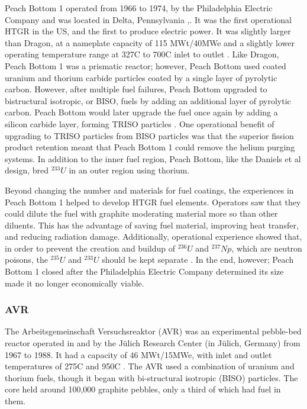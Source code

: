 Peach Bottom 1 operated from 1966 to 1974, by the Philadelphia Electric Company and was located in Delta, Pennsylvania \cite{beck_high_nodate},\cite{noauthor_peach_nodate}.  It was the first operational HTGR in the US, and the first to produce electric power.  It was slightly larger than Dragon, at a nameplate capacity of 115 MWt/40MWe and a slightly lower operating temperature range at 327\textdegree  C to 700\textdegree  C inlet to outlet \cite{beck_high_nodate}.  Like Dragon, Peach Bottom 1 was a prismatic reactor; however, Peach Bottom used coated uranium and thorium carbide particles coated by a single layer of pyrolytic carbon.  However, after multiple fuel failures, Peach Bottom upgraded to bistructural isotropic, or BISO, fuels by adding an additional layer of pyrolytic carbon.  Peach Bottom would later upgrade the fuel once again by adding a silicon carbide layer, forming TRISO particles \cite{beck_high_nodate}.  One operational benefit of upgrading to TRISO particles from BISO particles was that the superior fission product retention meant that Peach Bottom 1 could remove the helium purging systems.  In addition to the inner fuel region, Peach Bottom, like the Daniels et al design, bred $^{233}U$ in an outer region using thorium.

Beyond changing the number and materials for fuel coatings, the experiences in Peach Bottom 1 helped to develop HTGR fuel elements.  Operators saw that they could dilute the fuel with graphite moderating material more so than other diluents.  This has the advantage of saving fuel material, improving heat transfer, and reducing radiation damage.  Additionally, operational experience showed that, in order to prevent the creation and buildup of $^{236}U$ and $^{237}Np$, which are neutron poisons, the $^{235}U$ and $^{233}U$ should be kept separate \cite{simnad_early_1991}.  In the end, however; Peach Bottom 1 closed after the Philadelphia Electric Company determined its size made it no longer economically viable.

\subsubsection{AVR}
\label{avr}

The Arbeitsgemeinschaft Versuchsreaktor (AVR) was an experimental pebble-bed reactor operated in and by the Jülich Research Center (in Jülich, Germany) from 1967 to 1988.  It had a capacity of 46 MWt/15MWe, with inlet and outlet temperatures of 275\textdegree  C and 950\textdegree  C \cite{beck_high_nodate}.  The AVR used a combination of uranium and thorium fuels, though it began with bi-structural isotropic (BISO) particles.  The core held around 100,000 graphite pebbles, only a third of which had fuel in them.

